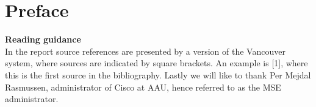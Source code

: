 \chapter*{Preface}

\textbf{Reading guidance}\\


In the report source references are presented by a version of the Vancouver system, where sources are indicated by square brackets. An example is [1], where this is the first source in the bibliography.
Lastly we will like to thank Per Mejdal Rasmussen, administrator of Cisco at AAU, hence referred to as the MSE administrator. 

\begin{multicols}{2}
\signature{Oliver B. Købsted}
\signature{Anders L. Matthiassen}
\signature{Jacob Nielsen}
\signature{Simon A. Pedersen}
\end{multicols}